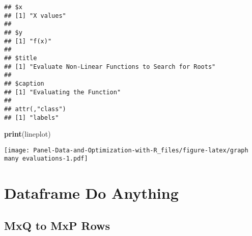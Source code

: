 \documentclass[
]{book}
\newenvironment{Shaded}{\begin{snugshade}}{\end{snugshade}}
\newcommand{\DataTypeTok}[1]{\textcolor[rgb]{0.13,0.29,0.53}{#1}}
\newcommand{\DecValTok}[1]{\textcolor[rgb]{0.00,0.00,0.81}{#1}}
\newcommand{\KeywordTok}[1]{\textcolor[rgb]{0.13,0.29,0.53}{\textbf{#1}}}
\newcommand{\NormalTok}[1]{#1}
\newcommand{\OperatorTok}[1]{\textcolor[rgb]{0.81,0.36,0.00}{\textbf{#1}}}
\newcommand{\StringTok}[1]{\textcolor[rgb]{0.31,0.60,0.02}{#1}}
\begin{document}
\begin{Shaded}
\end{Shaded}

\begin{verbatim}
## $x
## [1] "X values"
## 
## $y
## [1] "f(x)"
## 
## $title
## [1] "Evaluate Non-Linear Functions to Search for Roots"
## 
## $caption
## [1] "Evaluating the Function"
## 
## attr(,"class")
## [1] "labels"
\end{verbatim}

\begin{Shaded}
\begin{Highlighting}[]
\KeywordTok{print}\NormalTok{(lineplot)}
\end{Highlighting}
\end{Shaded}

\texttt{[image: Panel-Data-and-Optimization-with-R\_files/figure-latex/graph many evaluations-1.pdf]}

\hypertarget{dataframe-do-anything}{%
\section{Dataframe Do Anything}\label{dataframe-do-anything}}

\hypertarget{mxq-to-mxp-rows}{%
\subsection{MxQ to MxP Rows}\label{mxq-to-mxp-rows}}
\end{document}
